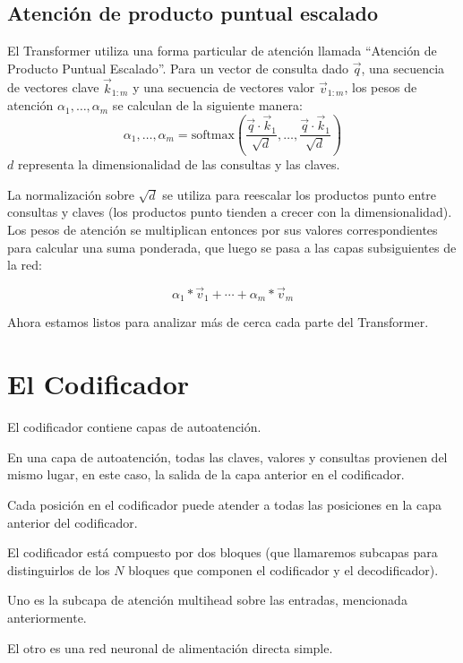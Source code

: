 \subsection{Atención de producto puntual escalado}
El Transformer utiliza una forma particular de atención llamada ``Atención de Producto Puntual Escalado''. Para un vector de consulta dado $\vec{q}$, una secuencia de vectores clave $\vec{k}_{1:m}$ y una secuencia de vectores valor $\vec{v}_{1:m}$, los pesos de atención $\alpha_1,\dots,\alpha_m$ se calculan de la siguiente manera:
\begin{displaymath}
\alpha_1,\dots,\alpha_m = \text{softmax}\left(\frac{\vec{q} \cdot \vec{k}_{1}}{\sqrt{d}}, \dots,\frac{\vec{q} \cdot \vec{k}_{1}}{\sqrt{d}}\right)
\end{displaymath}
$d$ representa la dimensionalidad de las consultas y las claves.

La normalización sobre $\sqrt{d}$ se utiliza para reescalar los productos punto entre consultas y claves (los productos punto tienden a crecer con la dimensionalidad). Los pesos de atención se multiplican entonces por sus valores correspondientes para calcular una suma ponderada, que luego se pasa a las capas subsiguientes de la red:

\begin{displaymath}
\alpha_1*\vec{v}_1+\cdots+\alpha_m*\vec{v}_m
\end{displaymath}

Ahora estamos listos para analizar más de cerca cada parte del Transformer.

\section{El Codificador}
El codificador contiene capas de autoatención.

En una capa de autoatención, todas las claves, valores y consultas provienen del mismo lugar, en este caso, la salida de la capa anterior en el codificador.

Cada posición en el codificador puede atender a todas las posiciones en la capa anterior del codificador.

El codificador está compuesto por dos bloques (que llamaremos subcapas para distinguirlos de los $N$ bloques que componen el codificador y el decodificador).

Uno es la subcapa de atención multihead sobre las entradas, mencionada anteriormente.

El otro es una red neuronal de alimentación directa simple.

